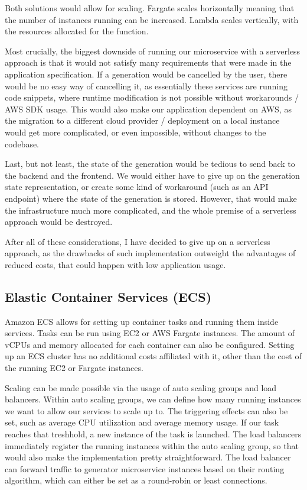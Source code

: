		Both solutions would allow for scaling. Fargate scales horizontally meaning that the number of instances running can be increased.
		Lambda scales vertically, with the resources allocated for the function. 

		Most crucially, the biggest downside of running our microservice with a serverless approach is that it would not satisfy many requirements
		that were made in the application specification. If a generation would be cancelled by the user, there would be no easy way of cancelling it, 
		as essentially these services are running code snippets, where runtime modification is not possible without workarounds / AWS SDK usage. This 
		would also make our application dependent on AWS, as the migration to a different cloud provider / deployment on a local instance would get more
		complicated, or even impossible, without changes to the codebase. 

		Last, but not least, the state of the generation would be tedious to send back to the backend and the frontend. 
		We would either have to give up on the
		generation state representation, or create some kind of workaround (such as an API endpoint) where the state of the generation is
		stored. However, that would make the infrastructure much more complicated, and the whole premise of a serverless approach would 
		be destroyed.

		After all of these considerations, I have decided to give up on a serverless approach, as the drawbacks of such implementation
		outweight the advantages of reduced costs, that could happen with low application usage.
		

	\subsection{Elastic Container Services (ECS)}
		Amazon ECS allows for setting up container tasks and running them inside services. Tasks can be run using EC2 or AWS Fargate instances.
		The amount of vCPUs and memory allocated for each container can also be configured.
		Setting up an ECS cluster has no additional costs affiliated with it, other than the cost of the running EC2 or Fargate instances.

		Scaling can be made possible via the usage of auto scaling groups and load balancers. Within auto scaling groups, we can define how many
		running instances we want to allow our services to scale up to. The triggering effects can also be set, such as average CPU utilization and 
		average memory usage. If our task reaches that treshhold, a new instance of the task is launched.  
		The load balancers immediately register the running instances within the auto
		scaling group, so that would also make the implementation pretty straightforward. The load balancer can forward traffic to generator 
		microservice instances based on their routing algorithm, which can either be set as a round-robin or least connections.

